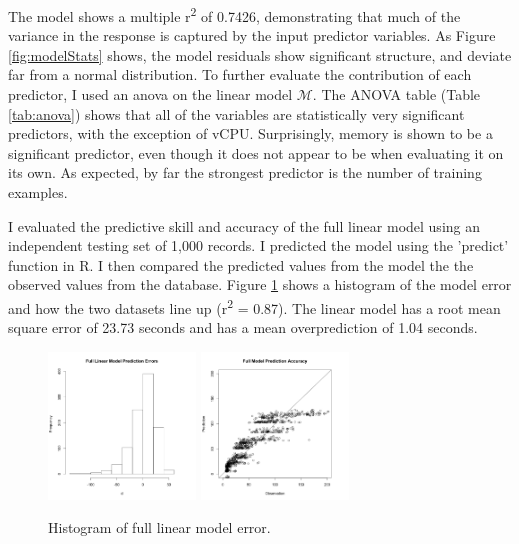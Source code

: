 \documentclass[a4paper]{article}
\begin{document}
The model shows a multiple r\textsuperscript{2} of 0.7426, demonstrating that much of the variance in the response is captured by the input predictor variables.  As Figure \ref{fig:modelStats} shows, the model residuals show significant structure, and deviate far from a normal distribution.  To further evaluate the contribution of each predictor, I used an anova on the linear model $\mathcal{M}$.  The ANOVA table (Table \ref{tab:anova}) shows that all of the variables are statistically very significant predictors, with the exception of vCPU. Surprisingly, memory is shown to be a significant predictor, even though it does not appear to be when evaluating it on its own.  As expected, by far the strongest predictor is the number of training examples.

I evaluated the predictive skill and accuracy of the full linear model using an independent testing set of 1,000 records.  I predicted the model using the 'predict' function in R.  I then compared the predicted values from the model the the observed values from the database. Figure  \ref{fig:full_hist} shows a histogram of the model error and how the two datasets line up (r\textsuperscript{2} = 0.87).  The linear model has a root mean square error of 23.73 seconds and has a mean overprediction of 1.04 seconds.  

\begin{figure}
\begin{centering}
\includegraphics[width=0.35\textwidth]{full_hist.png}
\includegraphics[width=0.35\textwidth]{full_model_accuracy.png}
\caption{\label{fig:full_hist}Histogram of full linear model error.}
\end{centering}
\end{figure}
\end{document}
